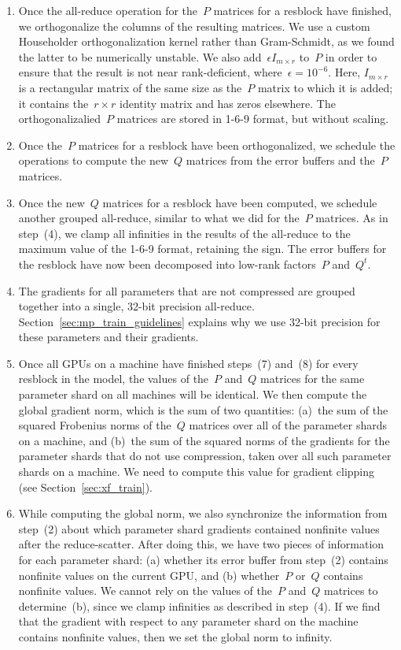 \documentclass{article}
\begin{document}
\begin{enumerate}
    \item Once the all-reduce operation for the~$P$ matrices for a resblock have finished, we orthogonalize the columns of the resulting matrices. We use a custom Householder orthogonalization kernel rather than Gram-Schmidt, as we found the latter to be numerically unstable. We also add~$\epsilon I_{m \times r}$ to~$P$ in order to ensure that the result is not near rank-deficient, where~$\epsilon = 10^{-6}$. Here, $I_{m \times r}$ is a rectangular matrix of the same size as the~$P$ matrix to which it is added; it contains the~$r \times r$ identity matrix and has zeros elsewhere. The orthogonalizalied~$P$ matrices are stored in 1-6-9 format, but without scaling. 
    \item Once the~$P$ matrices for a resblock have been orthogonalized, we schedule the operations to compute the new~$Q$ matrices from the error buffers and the~$P$ matrices.
    \item Once the new~$Q$ matrices for a resblock have been computed, we schedule another grouped all-reduce, similar to what we did for the~$P$ matrices. As in step~(4), we clamp all infinities in the results of the all-reduce to the maximum value of the 1-6-9 format, retaining the sign. The error buffers for the resblock have now been decomposed into low-rank factors~$P$ and~$Q^t$.
    \item The gradients for all parameters that are not compressed are grouped together into a single, 32-bit precision all-reduce. Section~\ref{sec:mp_train_guidelines} explains why we use 32-bit precision for these parameters and their gradients.
    \item Once all GPUs on a machine have finished steps~(7) and~(8) for every resblock in the model, the values of the~$P$ and~$Q$ matrices for the same parameter shard on all machines will be identical. We then compute the global gradient norm, which is the sum of two quantities: (a)~the sum of the squared Frobenius norms of the~$Q$ matrices over all of the parameter shards on a machine, and (b)~the sum of the squared norms of the gradients for the parameter shards that do not use compression, taken over all such parameter shards on a machine. We need to compute this value for gradient clipping (see Section~\ref{sec:xf_train}).
    \item While computing the global norm, we also synchronize the information from step~(2) about which parameter shard gradients contained nonfinite values after the reduce-scatter. After doing this, we have two pieces of information for each parameter shard: (a) whether its error buffer from step~(2) contains nonfinite values on the current GPU, and (b) whether~$P$ or~$Q$ contains nonfinite values. We cannot rely on the values of the~$P$ and~$Q$ matrices to determine~(b), since we clamp infinities as described in step~(4). If we find that the gradient with respect to any parameter shard on the machine contains nonfinite values, then we set the global norm to infinity.

\end{enumerate}
\end{document}

